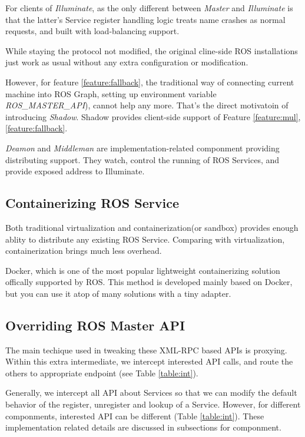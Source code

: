 For clients of \emph{Illuminate}, as the only different between \emph{Master} and \emph{Illuminate}
is that the latter's Service register handling logic treats name crashes as normal requests, 
and built with load-balancing support.

While staying the protocol not modified, the original cline-side ROS
installations just work as usual without any extra configuration or modification.

However, for feature \ref{feature:fallback}, the traditional way of connecting current machine into ROS Graph,
setting up environment variable \emph{ROS\_MASTER\_API}), cannot help any more.
That's the direct motivatoin of introducing \emph{Shadow}.
Shadow provides client-side support of Feature \ref{feature:mul}, \ref{feature:fallback}. 

\emph{Deamon} and \emph{Middleman} are implementation-related componment providing distributing support.
They watch, control the running of ROS Services, and provide exposed address to Illuminate.

\subsection{Containerizing ROS Service}
Both traditional virtualization and containerization(or sandbox) provides enough ablity to distribute any existing ROS Service.
Comparing with virtualization, containerization brings much less overhead.

Docker, which is one of the most popular lightweight containerizing solution offically supported by ROS.
This method is developed mainly based on Docker, but you can use it atop of many solutions with a tiny adapter. 

\subsection{Overriding ROS Master API}
The main techique used in tweaking these XML-RPC based APIs is proxying.
Within this extra intermediate, we intercept interested API calls,
and route the others to appropriate endpoint (see Table \ref{table:int}).

Generally, we intercept all API about Services so that we can modify the default behavior of the register,
unregister and lookup of a Service.
However, for different componments, interested API can be different (Table \ref{table:int}).
These implementation related details are discussed in subsections for componment.
 
